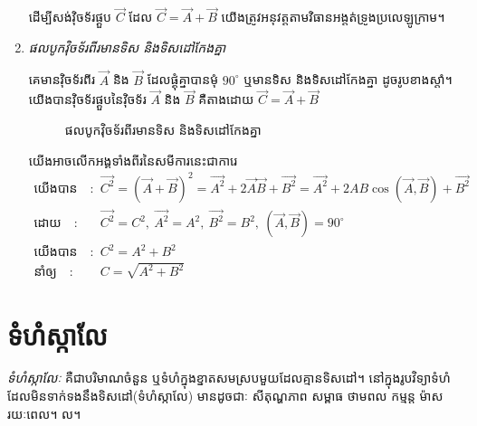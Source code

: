 \begin{enumerate}[m]
\begin{remark}
		ដើម្បីសង់វុិចទ័រផ្គួប $\overrightarrow{C}$ ដែល $\overrightarrow{C}=\overrightarrow{A}+\overrightarrow{B}$ យើងត្រូវអនុវត្តតាមវិធានអង្តត់ទ្រូងប្រលេឡូក្រាម។
	\end{remark}
	\item \emph{\kml ផលបូកវុិចទ័រពីរមានទិស និងទិសដៅកែងគ្នា}
	\begin{multicols}{2}
		\quad គេមានវុិចទ័រពីរ $\overrightarrow{A}$ និង $\overrightarrow{B}$ ដែលផ្គុំគ្នាបានមុំ $90^\circ$ ឬមានទិស និងទិសដៅកែងគ្នា ដូចរូបខាងស្តាំ។ យើងបានវុិចទ័រផ្គួបនៃវុិចទ័រ $\overrightarrow{A}$ និង $\overrightarrow{B}$ គឺតាងដោយ $\overrightarrow{C}=\overrightarrow{A}+\overrightarrow{B}$
		\begin{figure}[H]
			\centering
			\caption{ផលបូកវុិចទ័រពីរមានទិស និងទិសដៅកែងគ្នា}
		\end{figure}
	\end{multicols}
	យើងអាចលើកអង្គទាំងពីរនៃសមីការនេះជាការេ
	\begin{align*}
		\text{យើងបាន}\quad :&\quad \overrightarrow{C^{2}} =\left(\overrightarrow{A}+\overrightarrow{B}\right)^{2}=\overrightarrow{A^{2}} + 2\overrightarrow{A}\overrightarrow{B}+\overrightarrow{B^{2}}=\overrightarrow{A^{2}} + 2AB\cos\left(\overrightarrow{A},\overrightarrow{B}\right) +\overrightarrow{B^{2}}\\
		\text{ដោយ}\quad :&\quad \overrightarrow{C^{2}}=C^{2},~\overrightarrow{A^{2}}=A^{2},~\overrightarrow{B^{2}}=B^{2},~\left(\overrightarrow{A},\overrightarrow{B}\right)=90^\circ\\
		\text{យើងបាន}\quad :&\quad C^{2}=A^{2}+B^{2}\\
		\text{នាំឲ្យ}\quad :&\quad C=\sqrt{A^{2}+B^{2}}
	\end{align*}
\end{enumerate}
\section{ទំហំស្កាលែ}
\begin{definition}
	\emph{\kml ទំហំស្កាលែៈ} គឺជាបរិមាណចំនួន ឬទំហំក្នុងខ្នាតសមស្របមួយដែលគ្មានទិសដៅ។ នៅក្នុងរូបវិទ្យាទំហំដែលមិនទាក់ទងនឹងទិសដៅ(ទំហំស្កាលែ) មានដូចជាៈ សីតុណ្ហភាព សម្ពាធ ថាមពល កម្មន្ត ម៉ាស រយៈពេល។ ល។
\end{definition}
